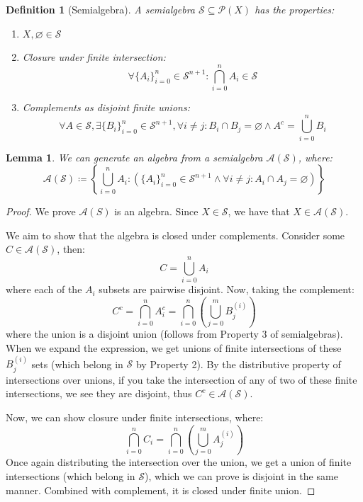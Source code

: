 \documentclass[10pt,letterpaper]{article} %
\newtheorem{lem}{Lemma}[section]
\newtheorem{defn}{Definition}[section]
\begin{document}
\begin{defn}[Semialgebra]
A semialgebra $\mathcal{S} \subseteq \mathcal{P}(X)$ has the properties:
\begin{enumerate}
\item $X, \varnothing \in \mathcal{S}$
\item Closure under finite intersection:
\begin{equation*}
\forall \{A_i\}_{i=0}^n \in \mathcal{S}^{n+1}: \bigcap_{i=0}^n A_i \in \mathcal{S}
\end{equation*}
\item Complements as disjoint finite unions:
\begin{equation*}
\forall A \in \mathcal{S}, \exists \{B_i\}_{i = 0}^n \in \mathcal{S}^{n+1}, \forall i \neq j: B_i \cap B_j = \varnothing \land A^c = \bigcup_{i=0}^n B_i
\end{equation*}
\end{enumerate}
\end{defn}

\begin{lem}
We can generate an algebra from a semialgebra $\mathcal{A}(\mathcal{S})$, where:
\begin{equation*}
\mathcal{A}(\mathcal{S}) \coloneq \left\{\bigcup_{i=0}^n A_i : (\{A_i\}_{i=0}^n \in \mathcal{S}^{n+1} \land \forall i \neq j: A_i \cap A_j = \varnothing)\right\}
\end{equation*}
\end{lem}
\begin{proof}
We prove $\mathcal{A}(S)$ is an algebra. Since $X \in \mathcal{S}$, we have that $X \in \mathcal{A}(\mathcal{S})$.

We aim to show that the algebra is closed under complements. Consider some $C \in \mathcal{A}(\mathcal{S})$, then:
\begin{equation*}
C = \bigcup_{i=0}^n A_i
\end{equation*}
where each of the $A_i$ subsets are pairwise disjoint. Now, taking the complement:
\begin{equation*}
C^c = \bigcap_{i=0}^n A_i^c = \bigcap_{i=0}^n \left(\bigcup_{j=0}^m B_j^{(i)}\right)
\end{equation*}
where the union is a disjoint union (follows from Property 3 of semialgebras). When we expand the expression, we get unions of finite intersections of these $B_j^{(i)}$ sets (which belong in $\mathcal{S}$ by Property 2).
By the distributive property of intersections over unions, if you take the intersection of any of two of these finite intersections, we see they are disjoint, thus $C^c \in \mathcal{A}(\mathcal{S})$. %

Now, we can show closure under finite intersections, where:
\begin{equation*}
\bigcap_{i=0}^n C_i = \bigcap_{i=0}^n \left(\bigcup_{j=0}^m A_j^{(i)}\right)
\end{equation*}
Once again distributing the intersection over the union, we get a union of finite intersections (which belong in $\mathcal{S}$), which we can prove is disjoint in the same manner. Combined with complement, it is closed under finite union.
\end{proof}
\end{document}

